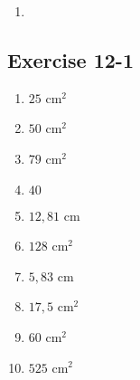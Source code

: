 \begin{enumerate}[itemsep=20pt, label=\textbf{\arabic*}.]
\begin{enumerate}[noitemsep, label=\textbf{(\alph*)} ]
\end{enumerate}


\item %

\end{enumerate}

\subsection{Exercise 12-1} %

\begin{enumerate}[noitemsep, label=\textbf{\arabic*}. ] 
 \item $25$ cm$^2$
\item $50$ cm$^2$
\item $79$ cm$^2$
\item $40$
\item $12,81$ cm
\item $128$ cm$^2$
\item $5,83$ cm
\item $17,5$ cm$^2$
\item $60$ cm$^2$
\item $525$ cm$^2$
\end{enumerate}
